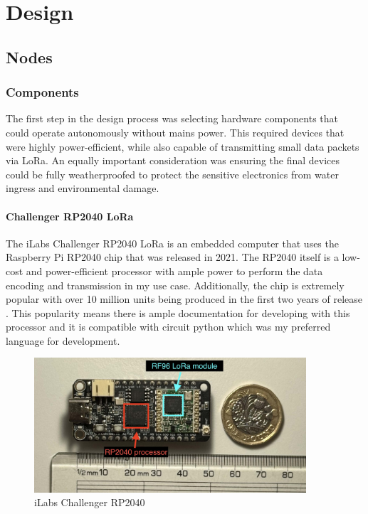 \section{Design}

\subsection{Nodes}

\subsubsection{Components}

The first step in the design process was selecting hardware components that
could operate autonomously without mains power. This required devices that were
highly power-efficient, while also capable of transmitting small data
packets via LoRa. An equally important consideration was ensuring the final
devices could be fully weatherproofed to protect the sensitive electronics from
water ingress and environmental damage.

\paragraph{Challenger RP2040 LoRa}

The iLabs Challenger RP2040 LoRa is an embedded computer that uses the Raspberry Pi
RP2040 chip that was released in 2021. The RP2040 itself is a low-cost and
power-efficient processor with ample power to perform the data encoding and
transmission in my use case. Additionally, the chip is extremely popular with
over 10 million units being produced in the first two years of release
\cite{pounder2023}. This popularity means there is ample documentation for
developing with this processor and it is compatible with circuit python which was
my preferred language for development.

\begin{figure}[H]
    \centering
    \includegraphics[width=0.9\textwidth]{contents/22-hw-design/22-fig/challenger-rp2040.jpg}
    \caption{iLabs Challenger RP2040}
    \label{fig:challenger-rp2040}
\end{figure}

